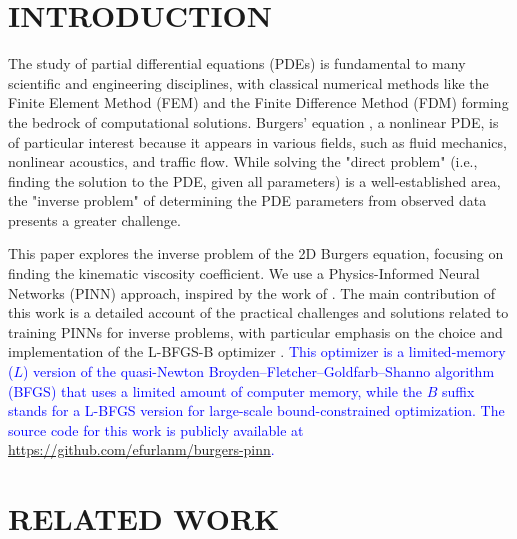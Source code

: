\documentclass[12pt,fleqn]{article}
\renewcommand{\headrulewidth}{0.0pt}
\begin{document}
\renewcommand{\headrulewidth}{0.0pt}
\rhead{}

\pagestyle{fancy}


\section{INTRODUCTION}

The study of partial differential equations (PDEs) is fundamental to many scientific and engineering disciplines, with classical numerical methods like the Finite Element Method (FEM) \citep{zienkiewicz2013} and the Finite Difference Method (FDM) \citep{leveque2007} forming the bedrock of computational solutions. Burgers' equation \citep{burgers1948}, a nonlinear PDE, is of particular interest because it appears in various fields, such as fluid mechanics, nonlinear acoustics, and traffic flow. While solving the "direct problem" (i.e., finding the solution to the PDE, given all parameters) is a well-established area, the "inverse problem" of determining the PDE parameters from observed data presents a greater challenge.

This paper explores the inverse problem of the 2D Burgers equation, focusing on finding the kinematic viscosity coefficient. We use a Physics-Informed Neural Networks (PINN) approach, inspired by the work of \cite{raissi2019}. The main contribution of this work is a detailed account of the practical challenges and solutions related to training PINNs for inverse problems, with particular emphasis on the choice and implementation of the L-BFGS-B optimizer \citep{Zhu97}.
\textcolor{blue}{This optimizer is a limited-memory ($L$) version of the quasi-Newton Broyden–Fletcher–Goldfarb–Shanno algorithm (BFGS) that uses a limited amount of computer memory, while the $B$ suffix stands for a L-BFGS version for large-scale bound-constrained optimization. The source code for this work is publicly available at {\small \url{https://github.com/efurlanm/burgers-pinn}}.}

\section{RELATED WORK}
\end{document}
